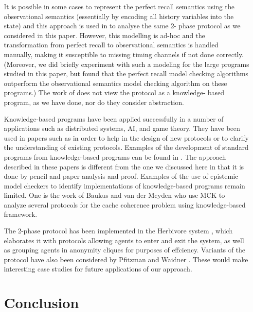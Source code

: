 \documentclass[]{llncs}
\begin{document}
\begin{theorem}
It is possible in some cases to represent the perfect
recall semantics using the observational semantics (essentially by  
encoding all history variables into the
state) and this approach is used in \cite{LSGWY} to analyse the same 2- 
phase protocol as
we considered in this paper.
However, this modelling is ad-hoc and the transformation from perfect  
 recall to observational semantics is
handled manually, making it susceptible to missing timing channels if  
not done correctly.
(Moreover, we did briefly experiment with such a modeling for the  
large programs studied in this paper, but
found that the perfect recall model checking algorithms outperform the  
observational semantics
model checking algorithm on these programs.)
The work of \cite{LSGWY} does not view the protocol as a knowledge- 
based program, as we have done,
nor do they consider abstraction.

Knowledge-based programs have been applied successfully in a number of  
applications such as
distributed systems, AI, and game theory. They have been used in  
papers such as
\cite{DM86,Had87,HZ92,BaukusM04,NT93} in order to help in the  
design of new protocols or to clarify
the understanding of existing protocols.
Examples of the development of standard programs from knowledge-based  
programs
can be found in \cite{APPG88,DM86,SR86}.
The approach described in these papers is different from the one we  
discussed here in that it is done by pencil and paper analysis and proof.
Examples of the use of epistemic model checkers to identify  
implementations of knowledge-based programs
remain limited. One is the  work of Baukus and van der Meyden  
\cite{BaukusM04} who use MCK
to analyze several protocols for the cache coherence problem using  
knowledge-based framework.

The 2-phase protocol has been implemented in the Herbivore system  
\cite{Herbivore}, which elaborates it
with protocols allowing agents to enter and exit the system, as well  
as grouping agents in
anonymity cliques for purposes of effciency. Variants of the protocol  
have also been considered by
Pfitzman and Waidner \cite{WP}.
These would make interesting case studies for future applications of  
our approach.

\section{Conclusion}\label{sec:concl} 


\end{theorem}
\end{document}
